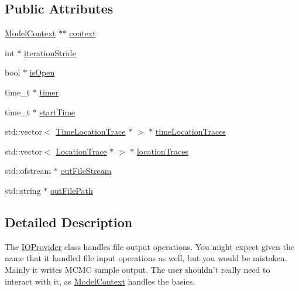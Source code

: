 \subsection*{Public Attributes}
\begin{DoxyCompactItemize}
\item 
\hyperlink{classSpatialSEIR_1_1ModelContext}{Model\-Context} $\ast$$\ast$ \hyperlink{classSpatialSEIR_1_1IOProvider_add6cc02df595bc12b3ac76ce148cc3dc}{context}
\item 
int $\ast$ \hyperlink{classSpatialSEIR_1_1IOProvider_a756afb68ee349d9715566fa9fdc4d37e}{iteration\-Stride}
\item 
bool $\ast$ \hyperlink{classSpatialSEIR_1_1IOProvider_ac482c0b2eccc9c587a08ae61f588e23e}{is\-Open}
\item 
time\-\_\-t $\ast$ \hyperlink{classSpatialSEIR_1_1IOProvider_acab89531190c3433ea0fe1bc3f14aa0f}{timer}
\item 
time\-\_\-t $\ast$ \hyperlink{classSpatialSEIR_1_1IOProvider_a4900b2f77db4845e2db1e5511b1f513b}{start\-Time}
\item 
std\-::vector$<$ \hyperlink{structSpatialSEIR_1_1TimeLocationTrace}{Time\-Location\-Trace} $\ast$ $>$ $\ast$ \hyperlink{classSpatialSEIR_1_1IOProvider_ad1fa227b00c230cc9549e682c17d5c1c}{time\-Location\-Traces}
\item 
std\-::vector$<$ \hyperlink{structSpatialSEIR_1_1LocationTrace}{Location\-Trace} $\ast$ $>$ $\ast$ \hyperlink{classSpatialSEIR_1_1IOProvider_a3dcb1c064746cd7e9fd6e15c1b55540d}{location\-Traces}
\item 
std\-::ofstream $\ast$ \hyperlink{classSpatialSEIR_1_1IOProvider_a7ce442ee5f7eda58ff86e68d3df07edc}{out\-File\-Stream}
\item 
std\-::string $\ast$ \hyperlink{classSpatialSEIR_1_1IOProvider_a744600dd48a3b8a0f6d65dda5f160bda}{out\-File\-Path}
\end{DoxyCompactItemize}


\subsection{Detailed Description}
The \hyperlink{classSpatialSEIR_1_1IOProvider}{I\-O\-Provider} class handles file output operations. You might expect given the name that it handled file input operations as well, but you would be mistaken. Mainly it writes M\-C\-M\-C sample output. The user shouldn't really need to interact with it, as \hyperlink{classSpatialSEIR_1_1ModelContext}{Model\-Context} handles the basics. 

